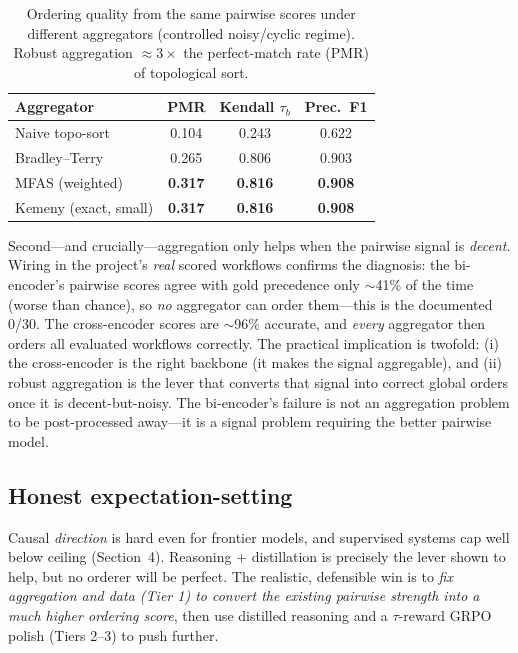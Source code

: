 \begin{table}[h]
\centering\footnotesize
\begin{tabular}{lccc}
\toprule
Aggregator & PMR & Kendall $\tau_b$ & Prec.\ F1 \\
\midrule
Naive topo-sort       & 0.104 & 0.243 & 0.622 \\
Bradley--Terry        & 0.265 & 0.806 & 0.903 \\
MFAS (weighted)       & \textbf{0.317} & \textbf{0.816} & \textbf{0.908} \\
Kemeny (exact, small) & \textbf{0.317} & \textbf{0.816} & \textbf{0.908} \\
\bottomrule
\end{tabular}
\caption{Ordering quality from the same pairwise scores under different aggregators
(controlled noisy/cyclic regime). Robust aggregation $\approx 3\times$ the perfect-match
rate (PMR) of topological sort.}
\end{table}

Second---and crucially---aggregation only helps when the pairwise signal is
\emph{decent}. Wiring in the project's \emph{real} scored workflows confirms the
diagnosis: the bi-encoder's pairwise scores agree with gold precedence only
$\sim$41\% of the time (worse than chance), so \emph{no} aggregator can order them---this
is the documented 0/30. The cross-encoder scores are $\sim$96\% accurate, and \emph{every}
aggregator then orders all evaluated workflows correctly. The practical implication is
twofold: (i) the cross-encoder is the right backbone (it makes the signal aggregable), and
(ii) robust aggregation is the lever that converts that signal into correct global orders
once it is decent-but-noisy. The bi-encoder's failure is not an aggregation problem to be
post-processed away---it is a signal problem requiring the better pairwise model.

\subsection{Honest expectation-setting}
Causal \emph{direction} is hard even for frontier models, and supervised systems cap well
below ceiling (Section~4). Reasoning + distillation is precisely the lever shown to help,
but no orderer will be perfect. The realistic, defensible win is to \emph{fix aggregation
and data (Tier 1) to convert the existing pairwise strength into a much higher ordering
score}, then use distilled reasoning and a $\tau$-reward GRPO polish (Tiers 2--3) to push
further.
